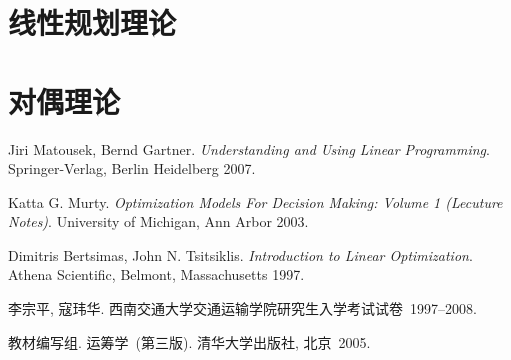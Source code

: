 \documentclass[a4paper,12pt]{article}
\begin{document}
\begin{CJK*}{UTF8}{gbsn}
\section{线性规划理论}

\section{对偶理论}







\begin{thebibliography}{5}

 Jiri Matousek, Bernd Gartner. 
\emph{Understanding and Using Linear Programming}. 
Springer-Verlag, Berlin Heidelberg 2007. 

 Katta G. Murty. 
\emph{Optimization Models For Decision Making: Volume 1 (Lecuture Notes)}. 
University of Michigan, Ann Arbor 2003. 

Dimitris Bertsimas, John N. Tsitsiklis. 
\emph{Introduction to Linear Optimization}. 
Athena Scientific, Belmont, Massachusetts 1997. 

 李宗平, 寇玮华. 
西南交通大学交通运输学院研究生入学考试试卷~1997--2008. 

 教材编写组. 
运筹学~(第三版). 清华大学出版社, 北京~2005. 

\end{thebibliography}

\end{CJK*}
\end{document}
